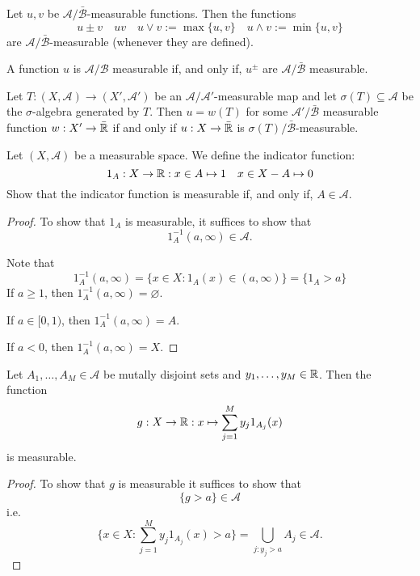 \begin{thm}
Let \(u,v\) be \(\mathcal{A}/\bar{\mathcal{B}}\)-measurable functions. Then the functions
\[
u\pm v \quad uv\quad u\vee v:=\max\{u,v\}\quad u\wedge v:=\min\{u,v\}
\]
are \(\mathcal{A}/\bar{\mathcal{B}}\)-measurable (whenever they are defined).
\end{thm}

\begin{thm}
A function \(u\) is \(\mathcal{A}/\mathcal{B}\) measurable if, and only if, \(u^\pm \) are \(\mathcal{A}/\bar{\mathcal{B}}\) measurable.
\end{thm}

\begin{thm}
Let \(T:(X,\mathcal{A})\rightarrow (X',\mathcal{A}')\) be an \(\mathcal{A}/\mathcal{A}'\)-measurable map and let \(\sigma (T)\subseteq \mathcal{A}\) be the \(\sigma \)-algebra generated by \(T\). Then \(u=w(T)\) for some \(\mathcal{A}'/\bar{\mathcal{B}}\) measurable function \(w:X'\rightarrow \bar{\Bbb{R}}\) if and only if
\(u:X\rightarrow \bar{\Bbb{R}}\) is \(\sigma (T)/\bar{\mathcal{B}}\)-measurable.
\end{thm}

\begin{prop}
Let \((X,\mathcal{A})\) be a measurable space. We define the indicator function:
\[
1_A : X\rightarrow  \Bbb{R} : x\in A \mapsto 1 \quad  x\in X-A\mapsto 0
\]
Show that the indicator function is measurable if, and only if, \(A\in \mathcal{A}.\)
\end{prop}

\begin{proof}
To show that \(1_A\) is measurable, it suffices to show that
\[
1_A^{-1}(a,\infty )\in \mathcal{A}.
\]

Note that
\[
1_A^{-1}(a,\infty )=\{x\in X:1_A(x)\in (a,\infty )\}=\{1_A >a\}
\]
If \(a\geq 1\), then \(1_A^{-1}(a,\infty )=\varnothing \).

If \(a\in [0,1)\), then  \(1_A^{-1}(a,\infty )=A.\)

If \(a<0\), then \(1_A^{-1}(a,\infty )=X\).
\end{proof}

\begin{prop}
Let \(A_{1},\ldots ,A_M\in \mathcal{A}\) be mutally disjoint sets and \(y_{1},\ldots ,y_M\in \Bbb{R}\). Then the function
\[
g: X\rightarrow \Bbb{R} : x\mapsto \sum _{j=1}^M y_{j}1_{A_{j}}(x)
\]
is measurable.
\end{prop}

\begin{proof}
To show that \(g\) is measurable it suffices to show that
\[
\{g>a\}\in \mathcal{A}
\]
i.e.
\[
\Big\{x\in X:\sum _{j=1}^M y_{j}1_{A_{j}}(x)>a\Big\}=\bigcup _{j:y_{j}>a}A_{j}\in \mathcal{A}.
\]
\end{proof}

